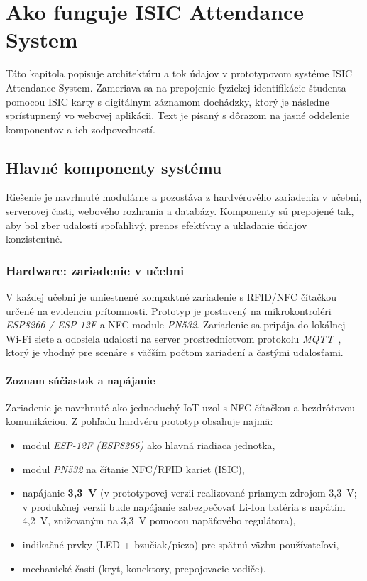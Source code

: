 \chapter{Ako funguje ISIC Attendance System}

Táto kapitola popisuje architektúru a tok údajov v prototypovom systéme ISIC Attendance System. Zameriava sa na prepojenie fyzickej identifikácie študenta pomocou ISIC karty s digitálnym záznamom dochádzky, ktorý je následne sprístupnený vo webovej aplikácii. Text je písaný s dôrazom na jasné oddelenie komponentov a ich zodpovedností.

\section{Hlavné komponenty systému}

Riešenie je navrhnuté modulárne a pozostáva z hardvérového zariadenia v učebni, serverovej časti, webového rozhrania a databázy. Komponenty sú prepojené tak, aby bol zber udalostí spoľahlivý, prenos efektívny a ukladanie údajov konzistentné.

\subsection{Hardware: zariadenie v učebni}
V každej učebni je umiestnené kompaktné zariadenie s RFID/NFC čítačkou určené na evidenciu prítomnosti. Prototyp je postavený na mikrokontroléri \textit{ESP8266 / ESP-12F} a NFC module \textit{PN532}. Zariadenie sa pripája do lokálnej Wi-Fi siete a odosiela udalosti na server prostredníctvom protokolu \textit{MQTT}~\cite{oasis:mqtt}, ktorý je vhodný pre scenáre s väčším počtom zariadení a častými udalosťami.

\subsubsection{Zoznam súčiastok a napájanie}
Zariadenie je navrhnuté ako jednoduchý IoT uzol s NFC čítačkou a bezdrôtovou komunikáciou. Z pohľadu hardvéru prototyp obsahuje najmä:
\begin{itemize}
  \item modul \textit{ESP-12F (ESP8266)} ako hlavná riadiaca jednotka,
  \item modul \textit{PN532} na čítanie NFC/RFID kariet (ISIC),
  \item napájanie \textbf{3,3~V} (v prototypovej verzii realizované priamym zdrojom 3,3~V; v produkčnej verzii bude napájanie zabezpečovať Li-Ion batéria s napätím 4,2~V, znižovaným na 3,3~V pomocou napäťového regulátora),
  \item indikačné prvky (LED + bzučiak/piezo) pre spätnú väzbu používateľovi,
  \item mechanické časti (kryt, konektory, prepojovacie vodiče).
\end{itemize}

